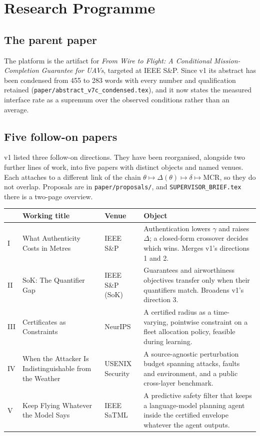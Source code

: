 \documentclass[11pt,a4paper]{article}
\newcommand{\code}[1]{\texttt{#1}}
\newcommand{\MCR}{\mathrm{MCR}}
\begin{document}
\section{Research Programme}
\label{sec:programme}

\subsection{The parent paper}
The platform is the artifact for \emph{From Wire to Flight: A Conditional
Mission-Completion Guarantee for UAVs}, targeted at IEEE S\&P. Since v1 its
abstract has been condensed from 455 to 283 words with every number and
qualification retained (\code{paper/abstract\_v7c\_condensed.tex}), and it now
states the measured interface rate as a supremum over the observed conditions
rather than an average.

\subsection{Five follow-on papers}
v1 listed three follow-on directions. They have been reorganised, alongside two
further lines of work, into five papers with distinct objects and named venues.
Each attaches to a different link of the chain
$\theta\mapsto\allowbreak\Delta(\theta)\mapsto\allowbreak\delta\mapsto\allowbreak\MCR$, so they do not overlap.
Proposals are in \code{paper/proposals/}, and \code{SUPERVISOR\_BRIEF.tex} there
is a two-page overview.

\begin{table}[H]
\centering\small
\begin{tabularx}{\linewidth}{@{}p{0.6cm}p{4.3cm}p{2.5cm}Y@{}}
\toprule
& \textbf{Working title} & \textbf{Venue} & \textbf{Object} \\
\midrule
I & What Authenticity Costs in Metres & IEEE S\&P &
Authentication lowers $\gamma$ and raises $\Delta$; a closed-form crossover
decides which wins. Merges v1's directions 1 and 2. \\
II & SoK: The Quantifier Gap & IEEE S\&P (SoK) &
Guarantees and airworthiness objectives transfer only when their quantifiers
match. Broadens v1's direction 3. \\
III & Certificates as Constraints & NeurIPS &
A certified radius as a time-varying, pointwise constraint on a fleet
allocation policy, feasible during learning. \\
IV & When the Attacker Is Indistinguishable from the Weather & USENIX Security &
A source-agnostic perturbation budget spanning attacks, faults and environment,
and a public cross-layer benchmark. \\
V & Keep Flying Whatever the Model Says & IEEE SaTML &
A predictive safety filter that keeps a language-model planning agent inside the
certified envelope whatever the agent outputs. \\
\bottomrule
\end{tabularx}
\end{table}
\end{document}
